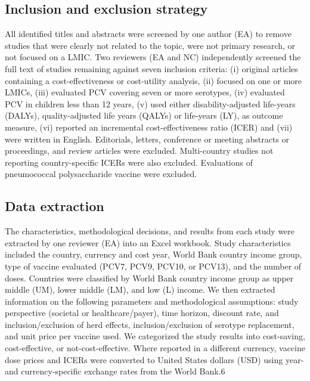 \documentclass[12pt]{article}
\begin{document}
\subsection{Inclusion and exclusion strategy}
All identified titles and abstracts were screened by one author (EA) to remove studies that were clearly not related to the topic, were not primary research, or not focused on a LMIC. Two reviewers (EA and NC) independently screened the full text of studies remaining against seven inclusion criteria: (i) original articles containing a cost-effectiveness or cost-utility analysis, (ii) focused on one or more LMICs, (iii) evaluated PCV covering seven or more serotypes, (iv) evaluated PCV in children less than 12 years, (v) used either disability-adjusted life-years (DALYs), quality-adjusted life years (QALYs) or life-years (LY), as outcome measure, (vi) reported an incremental cost-effectiveness ratio (ICER) and (vii) were written in English. Editorials, letters, conference or meeting abstracts or proceedings, and review articles were excluded. Multi-country studies not reporting country-specific ICERs were also excluded. Evaluations of pneumococcal polysaccharide vaccine were excluded.

\subsection{Data extraction}
The characteristics, methodological decisions, and results from each study were extracted by one reviewer (EA) into an Excel workbook. Study characteristics included the country, currency and cost year, World Bank country income group, type of vaccine evaluated (PCV7, PCV9, PCV10, or PCV13), and the number of doses. Countries were classified by World Bank country income group as upper middle (UM), lower middle (LM), and low (L) income. We then extracted information on the following parameters and methodological assumptions: study perspective (societal or healthcare/payer), time horizon, discount rate, and inclusion/exclusion of herd effects, inclusion/exclusion of serotype replacement, and unit price per vaccine used. We categorized the study results into cost-saving, cost-effective, or not-cost-effective. Where reported in a different currency, vaccine dose prices and ICERs were converted to United States dollars (USD) using year- and currency-specific exchange rates from the World Bank.6
\end{document}
